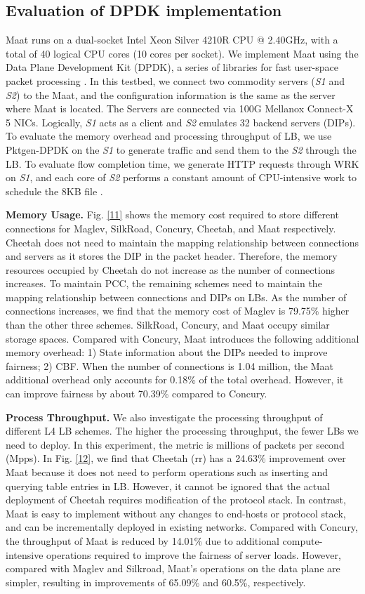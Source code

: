 \subsection{Evaluation of DPDK implementation}
Maat runs on a dual-socket Intel Xeon Silver 4210R CPU @ 2.40GHz, with a total of 40 logical CPU cores (10 cores per socket). We implement Maat using the Data Plane Development Kit (DPDK), a series of libraries for fast user-space packet processing \cite{pktgenDPDK}. In this testbed, we connect two commodity servers (\emph{S1} and \emph{S2}) to the Maat, and the configuration information is the same as the server where Maat is located. The Servers are connected via 100G Mellanox Connect-X 5 NICs. Logically, \emph{S1} acts as a client and \emph{S2} emulates 32 backend servers (DIPs). To evaluate the memory overhead and processing throughput of LB, we use Pktgen-DPDK \cite{pktgenDPDK} on the \emph{S1} to generate traffic and send them to the \emph{S2} through the LB. To evaluate flow completion time, we generate HTTP requests through WRK on \emph{S1}, and each core of \emph{S2} performs a constant amount of CPU-intensive work to schedule the 8KB file \cite{barbette2020high}.

\textbf{Memory Usage.} Fig. \ref{11} shows the memory cost required to store different connections for Maglev, SilkRoad, Concury, Cheetah, and Maat respectively. Cheetah does not need to maintain the mapping relationship between connections and servers as it stores the DIP in the packet header. Therefore, the memory resources occupied by Cheetah do not increase as the number of connections increases. To maintain PCC, the remaining schemes need to maintain the mapping relationship between connections and DIPs on LBs. As the number of connections increases, we find that the memory cost of Maglev is 79.75\% higher than the other three schemes. SilkRoad, Concury, and Maat occupy similar storage spaces. Compared with Concury, Maat introduces the following additional memory overhead: 1) State information about the DIPs needed to improve fairness; 2) CBF. When the number of connections is 1.04 million, the Maat additional overhead only accounts for 0.18\% of the total overhead. However, it can improve fairness by about 70.39\% compared to Concury.

\textbf{Process Throughput.} We also investigate the processing throughput of different L4 LB schemes. The higher the processing throughput, the fewer LBs we need to deploy. In this experiment, the metric is millions of packets per second (Mpps). In Fig. \ref{12}, we find that Cheetah (rr) has a 24.63\% improvement over Maat because it does not need to perform operations such as inserting and querying table entries in LB. However, it cannot be ignored that the actual deployment of Cheetah requires modification of the protocol stack. In contrast, Maat is easy to implement without any changes to end-hosts or protocol stack, and can be incrementally deployed in existing networks. Compared with Concury, the throughput of Maat is reduced by 14.01\% due to additional compute-intensive operations required to improve the fairness of server loads. However, compared with Maglev and Silkroad, Maat's operations on the data plane are simpler, resulting in improvements of 65.09\% and 60.5\%, respectively.

